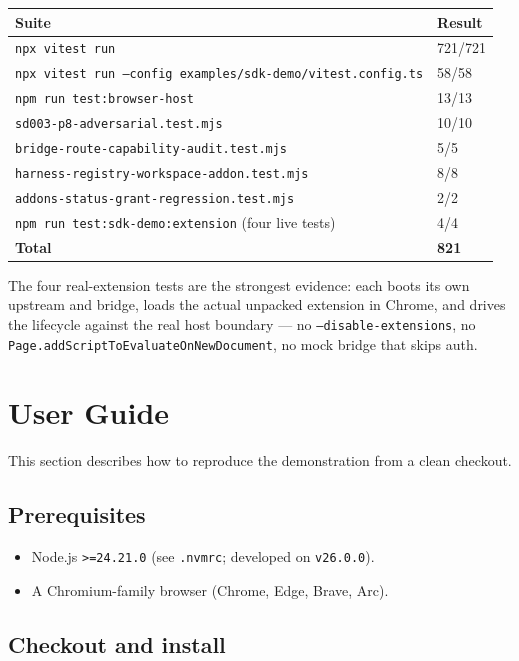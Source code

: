 \documentclass[11pt]{article}
\begin{document}
\begin{center}
\begin{tabular}{@{}p{8.6cm}p{4.6cm}@{}}
\toprule
\textbf{Suite} & \textbf{Result} \\
\midrule
\texttt{npx vitest run} & 721/721 \\
\texttt{npx vitest run --config examples/sdk-demo/vitest.config.ts} & 58/58 \\
\texttt{npm run test:browser-host} & 13/13 \\
\texttt{sd003-p8-adversarial.test.mjs} & 10/10 \\
\texttt{bridge-route-capability-audit.test.mjs} & 5/5 \\
\texttt{harness-registry-workspace-addon.test.mjs} & 8/8 \\
\texttt{addons-status-grant-regression.test.mjs} & 2/2 \\
\texttt{npm run test:sdk-demo:extension} (four live tests) & 4/4 \\
\midrule
\textbf{Total} & \textbf{821} \\
\bottomrule
\end{tabular}
\end{center}

The four real-extension tests are the strongest evidence: each boots its own
upstream and bridge, loads the actual unpacked extension in Chrome, and drives
the lifecycle against the real host boundary --- no \texttt{--disable-extensions},
no \texttt{Page.addScriptToEvaluateOnNewDocument}, no mock bridge that skips
auth.

\section{User Guide}

This section describes how to reproduce the demonstration from a clean
checkout.

\subsection{Prerequisites}

\begin{itemize}[leftmargin=1.5em]
  \item Node.js \texttt{>=24.21.0} (see \texttt{.nvmrc}; developed on
        \texttt{v26.0.0}).
  \item A Chromium-family browser (Chrome, Edge, Brave, Arc).
\end{itemize}

\subsection{Checkout and install}
\end{document}
